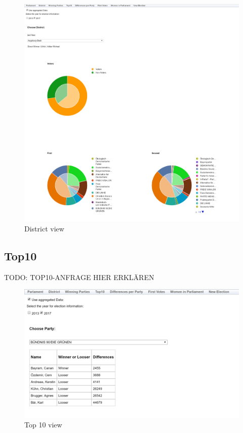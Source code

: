 \documentclass[a4paper]{scrreprt}
\begin{document}
\begin{figure}[H]
\centering
\includegraphics[width=\textwidth]{images/district.png}
\caption {District view}
\end{figure}

\subsection{Top10}

TODO: TOP10-ANFRAGE HIER ERKLÄREN

\begin{figure}[H]
\centering
\includegraphics[width=\textwidth]{images/top10.png}
\caption {Top 10 view}
\end{figure}
\end{document}
